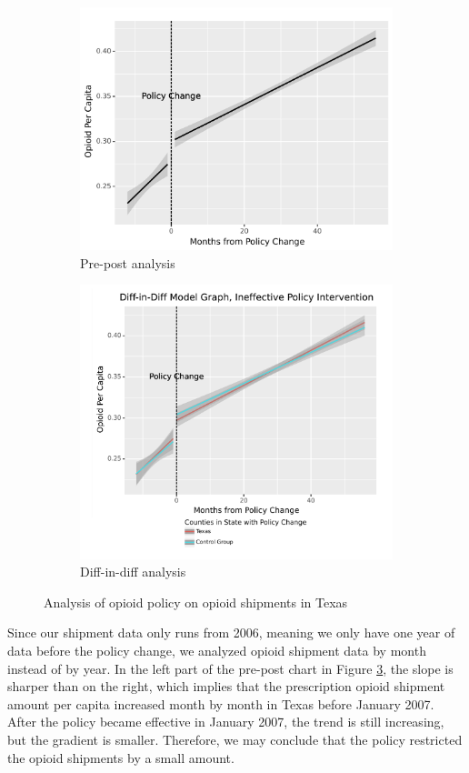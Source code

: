 \documentclass[12pt,letterpaper]{article}
\begin{document}
\begin{figure}[!h]
\centering
\begin{subfigure}{.5\textwidth}
  \centering
  \includegraphics[width=0.7\linewidth]{../30_results/Bonus_Results/tx_monthly_prepost_successful.png}
  \caption{Pre-post analysis}
  \label{fig:tx_ship_prepost}
\end{subfigure}%
\begin{subfigure}{.55\textwidth}
  \centering
  \includegraphics[width=0.7\linewidth]{../30_results/Bonus_Results/tx_monthly_did_notsure.png}
  \caption{Diff-in-diff analysis}
  \label{fig:tx_ship_did}
\end{subfigure}
\caption{Analysis of opioid policy on opioid shipments in Texas}
\label{fig:tx_ship}
\end{figure}
Since our shipment data only runs from 2006, meaning we only have one year of data before the policy change, we analyzed opioid shipment data by month instead of by year. In the left part of the pre-post chart in Figure \ref{fig:tx_ship}, the slope is sharper than on the right, which implies that the prescription opioid shipment amount per capita increased month by month in Texas before January 2007. After the policy became effective in January 2007, the trend is still increasing, but the gradient is smaller. Therefore, we may conclude that the policy restricted the opioid shipments by a small amount.
\end{document}
